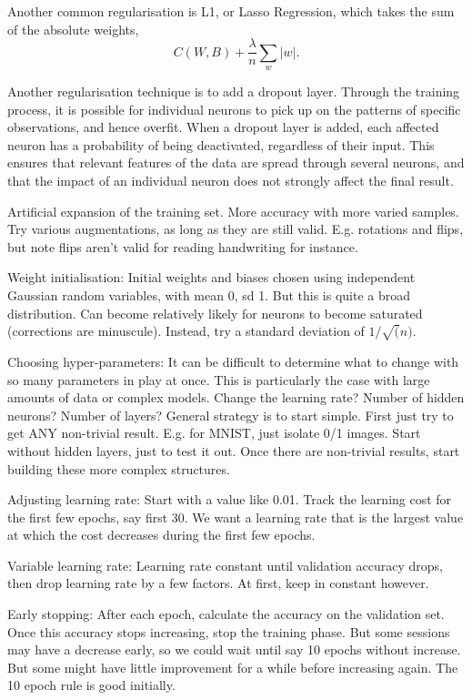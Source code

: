 \documentclass[honours,12pt]{unswthesis}
\numberwithin{equation}{section}
\begin{document}
Another common regularisation is L1, or Lasso Regression, which takes the sum of the absolute weights,
\[
	C(W,B) + \dfrac{\lambda}{n}\sum_w|w|.
\]

Another regularisation technique is to add a dropout layer. Through the training process, it is possible for individual neurons to pick up on the patterns of specific observations, and hence overfit. When a dropout layer is added, each affected neuron has a probability of being deactivated, regardless of their input. This ensures that relevant features of the data are spread through several neurons, and that the impact of an individual neuron does not strongly affect the final result.





Artificial expansion of the training set. More accuracy with more varied samples. Try various augmentations, as long as they are still valid. E.g. rotations and flips, but note flips aren't valid for reading handwriting for instance.

Weight initialisation: Initial weights and biases chosen using independent Gaussian random variables, with mean 0, sd 1. But this is quite a broad distribution. Can become relatively likely for neurons to become saturated (corrections are minuscule). Instead, try a standard deviation of $1/\sqrt(n)$.

Choosing hyper-parameters:
It can be difficult to determine what to change with so many parameters in play at once. This is particularly the case with large amounts of data or complex models. Change the learning rate? Number of hidden neurons? Number of layers? 
General strategy is to start simple. First just try to get ANY non-trivial result. E.g. for MNIST, just isolate 0/1 images. Start without hidden layers, just to test it out. Once there are non-trivial results, start building these more complex structures.

Adjusting learning rate:
Start with a value like 0.01. Track the learning cost for the first few epochs, say first 30. We want a learning rate that is the largest value at which the cost decreases during the first few epochs.

Variable learning rate:
Learning rate constant until validation accuracy drops, then drop learning rate by a few factors. At first, keep in constant however.

Early stopping:
After each epoch, calculate the accuracy on the validation set. Once this accuracy stops increasing, stop the training phase. But some sessions may have a decrease early, so we could wait until say 10 epochs without increase. But some might have little improvement for a while before increasing again. The 10 epoch rule is good initially.
\end{document}
